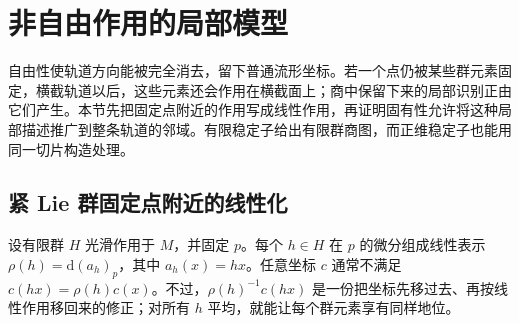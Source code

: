 
% 
% 
% 

\section{非自由作用的局部模型}
\label{g1:sec:1704}

自由性使轨道方向能被完全消去，留下普通流形坐标。若一个点仍被某些群元素固定，横截轨道以后，这些元素还会作用在横截面上；商中保留下来的局部识别正由它们产生。本节先把固定点附近的作用写成线性作用，再证明固有性允许将这种局部描述推广到整条轨道的邻域。有限稳定子给出有限群商图，而正维稳定子也能用同一切片构造处理。

\subsection{紧 Lie 群固定点附近的线性化}
\label{g1:subsec:1704:01}

设有限群 \(H\) 光滑作用于 \(M\)，并固定 \(p\)。每个 \(h\in H\) 在 \(p\) 的微分组成线性表示 \(\rho(h)=\mathrm{d}(a_h)_p\)，其中 \(a_h(x)=hx\)。任意坐标 \(c\) 通常不满足 \(c(hx)=\rho(h)c(x)\)。不过，\(\rho(h)^{-1}c(hx)\) 是一份把坐标先移过去、再按线性作用移回来的修正；对所有 \(h\) 平均，就能让每个群元素享有同样地位。

